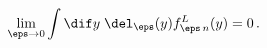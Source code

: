 \begin{equation}
\lim_{\eps\rightarrow 0} \int \dif y \; \del_\eps(y) f^L_{\eps\,n}(y)
= 0 \, . 
\end{equation}

